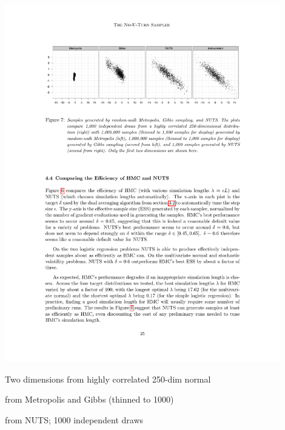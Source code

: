 \documentclass[10pt]{report}
\begin{document}
%
\begin{center}
\includegraphics[width=0.9\textwidth]{img/nuts-vs.pdf}
\end{center}
\begin{subitemize}
\item Two dimensions from highly correlated 250-dim normal
\item {} from Metropolis and Gibbs (thinned to 1000)
\item {} from NUTS; 1000 independent draws
\end{subitemize}
\end{document}

